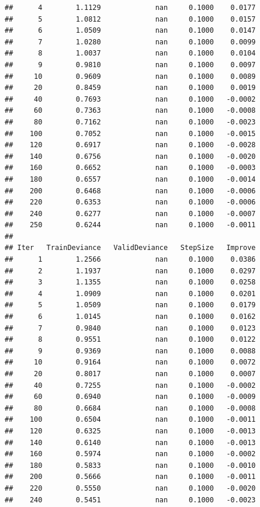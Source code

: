 \documentclass[]{book}
\begin{document}
\begin{verbatim}
##      4        1.1129             nan     0.1000    0.0177
##      5        1.0812             nan     0.1000    0.0157
##      6        1.0509             nan     0.1000    0.0147
##      7        1.0280             nan     0.1000    0.0099
##      8        1.0037             nan     0.1000    0.0104
##      9        0.9810             nan     0.1000    0.0097
##     10        0.9609             nan     0.1000    0.0089
##     20        0.8459             nan     0.1000    0.0019
##     40        0.7693             nan     0.1000   -0.0002
##     60        0.7363             nan     0.1000   -0.0008
##     80        0.7162             nan     0.1000   -0.0023
##    100        0.7052             nan     0.1000   -0.0015
##    120        0.6917             nan     0.1000   -0.0028
##    140        0.6756             nan     0.1000   -0.0020
##    160        0.6652             nan     0.1000   -0.0003
##    180        0.6557             nan     0.1000   -0.0014
##    200        0.6468             nan     0.1000   -0.0006
##    220        0.6353             nan     0.1000   -0.0006
##    240        0.6277             nan     0.1000   -0.0007
##    250        0.6244             nan     0.1000   -0.0011
## 
## Iter   TrainDeviance   ValidDeviance   StepSize   Improve
##      1        1.2566             nan     0.1000    0.0386
##      2        1.1937             nan     0.1000    0.0297
##      3        1.1355             nan     0.1000    0.0258
##      4        1.0909             nan     0.1000    0.0201
##      5        1.0509             nan     0.1000    0.0179
##      6        1.0145             nan     0.1000    0.0162
##      7        0.9840             nan     0.1000    0.0123
##      8        0.9551             nan     0.1000    0.0122
##      9        0.9369             nan     0.1000    0.0088
##     10        0.9164             nan     0.1000    0.0072
##     20        0.8017             nan     0.1000    0.0007
##     40        0.7255             nan     0.1000   -0.0002
##     60        0.6940             nan     0.1000   -0.0009
##     80        0.6684             nan     0.1000   -0.0008
##    100        0.6504             nan     0.1000   -0.0011
##    120        0.6325             nan     0.1000   -0.0013
##    140        0.6140             nan     0.1000   -0.0013
##    160        0.5974             nan     0.1000   -0.0002
##    180        0.5833             nan     0.1000   -0.0010
##    200        0.5666             nan     0.1000   -0.0011
##    220        0.5550             nan     0.1000   -0.0020
##    240        0.5451             nan     0.1000   -0.0023

\end{verbatim}
\end{document}
